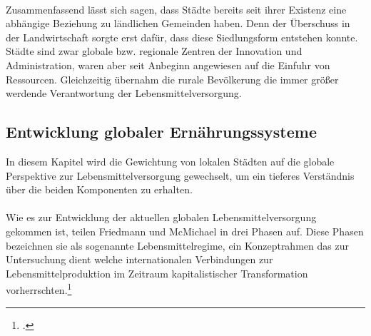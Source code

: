 \documentclass{scrartcl}
\begin{document}
\\
Zusammenfassend lässt sich sagen, dass Städte bereits seit ihrer Existenz eine abhängige Beziehung zu ländlichen Gemeinden haben. Denn der Überschuss in der Landwirtschaft sorgte erst dafür, dass diese Siedlungsform entstehen konnte. Städte sind zwar globale bzw. regionale Zentren der Innovation und Administration, waren aber seit Anbeginn angewiesen auf die Einfuhr von Ressourcen. Gleichzeitig übernahm die rurale Bevölkerung die immer größer werdende Verantwortung der Lebensmittelversorgung. 

\subsection{Entwicklung globaler Ernährungssysteme} \label{entwicklungglobal}
In diesem Kapitel wird die Gewichtung von lokalen Städten auf die globale Perspektive zur Lebensmittelversorgung gewechselt, um ein tieferes Verständnis über die beiden Komponenten zu erhalten.
\\
\\
Wie es zur Entwicklung der aktuellen globalen Lebensmittelversorgung gekommen ist, teilen Friedmann und McMichael in drei Phasen auf. Diese Phasen bezeichnen sie als sogenannte Lebensmittelregime, ein Konzeptrahmen das zur Untersuchung dient welche internationalen Verbindungen zur Lebensmittelproduktion im Zeitraum kapitalistischer Transformation vorherrschten.\footcite[Vgl.][S.95]{Friedmann1989AGRICULTUREPresent}
\end{document}
